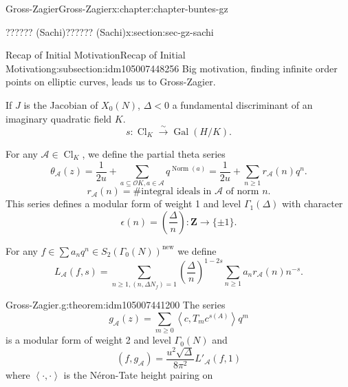 \documentclass[oneside,10pt,]{book}
\numberwithin{equation}{section}
\newcommand{\legendre}[2]{\left(\frac{#1}{#2}\right)}
\newcommand{\pair}[2]{\left\langle #1, #2 \right\rangle}
\newcommand{\ZZ}{\mathbf{Z}}
\newcommand{\ints}{\mathcal{O}}
\DeclareMathOperator{\Cl}{Cl}
\newcommand{\Gal}[2]{\operatorname{Gal}(#1/#2)}
\DeclareMathOperator{\norm}{Norm}
\newcommand{\lt}{<}
\begin{document}
\begin{chapterptx}{Gross-Zagier}{}{Gross-Zagier}{}{}{x:chapter:chapter-buntes-gz}
\begin{sectionptx}{?????? (Sachi)}{}{?????? (Sachi)}{}{}{x:section:sec-gz-sachi}
%
%
\typeout{************************************************}
\typeout{************************************************}
%
\begin{subsectionptx}{Recap of Initial Motivation}{}{Recap of Initial Motivation}{}{}{g:subsection:idm105007448256}
Big motivation, finding infinite order points on elliptic curves, leads us to Gross-Zagier.%
\par
If \(J\) is the Jacobian of \(X_0(N)\), \(\Delta \lt  0\) a fundamental discriminant of an imaginary quadratic field \(K\).%
\begin{equation*}
s \colon \Cl_K \xrightarrow\sim \Gal HK\text{.}
\end{equation*}
%
\par
For any \(\mathcal A \in \Cl_K\), we define the partial theta series%
\begin{equation*}
\theta _{\mathcal A} (z) = \frac{1}{2u} + \sum _{a \subseteq \ints K,a\in \mathcal A} q^{\norm(a)} = \frac{1}{2u} + \sum_{n \ge 1} r_{\mathcal A}(n)q^n\text{.}
\end{equation*}
%
\begin{equation*}
r_{\mathcal A}(n) = \#\text{integral ideals in }\mathcal A\text{ of norm }n\text{.}
\end{equation*}
This series defines a modular form of weight 1 and level \(\Gamma _1(\Delta )\) with character%
\begin{equation*}
\epsilon (n) = \legendre{\Delta }{n} \colon  \ZZ \to \{\pm 1\}\text{.}
\end{equation*}
%
\par
For any \(f \in \sum a_n q^n \in S_2(\Gamma _0(N))^{\text{new}}\) we define%
\begin{equation*}
L_{\mathcal A} (f,s) = \sum_{n \ge 1, (n, \Delta  N_f) = 1} \legendre\Delta n^{1-2s} \sum_{n\ge 1}a_n r_{\mathcal A}(n)n^{-s}\text{.}
\end{equation*}
%
\begin{theorem}{Gross-Zagier.}{}{g:theorem:idm105007441200}%
The series%
\begin{equation*}
g_{\mathcal A} (z) = \sum_{m \ge 0} \pair c{T_m c^{s(A)}} q^m
\end{equation*}
is a modular form of weight 2 and level \(\Gamma _0(N)\) and%
\begin{equation*}
(f,g_{\mathcal A }) = \frac{u^2 \sqrt\Delta }{8\pi ^2} L'_{\mathcal A}(f,1)
\end{equation*}
where \(\pair \cdot \cdot \) is the Néron-Tate height pairing on%

\end{theorem}
\end{subsectionptx}
\end{sectionptx}
\end{chapterptx}
\end{document}
